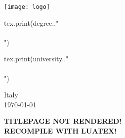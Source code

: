 \begin{titlepage}
\begin{center}
\vspace{1em}

\texttt{[image: logo]}

\vspace{1em}

\begin{luacode}
		tex.print(degree.."\\\\")
\end{luacode}
\begin{luacode}
		tex.print(university.."\\\\")
\end{luacode}
Italy \\
\today

\end{center}
\end{titlepage}
\else
\begin{titlepage}
\begin{center}
\textbf{\large{TITLEPAGE NOT RENDERED!\\RECOMPILE WITH LUATEX!}}
\end{center}
\end{titlepage}
\fi
\hypersetup{pageanchor=true}